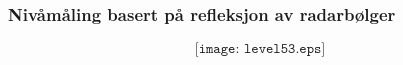 \documentclass[aspectratio=169,xcolor=dvipsnames]{beamer}
\begin{document}
%
%
%
%
%
\begin{frame}
	\frametitle{Nivåmåling basert på refleksjon av radarbølger}
%
$$\texttt{[image: level53.eps]}$$
\end{frame}
%
%
%
%
%
%
%
%
%
%
%
%
%
\end{document}
